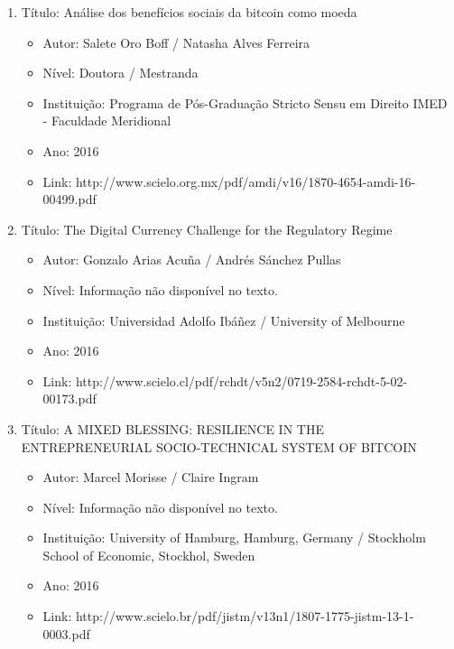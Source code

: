\documentclass[12pt]{article}
\begin{document}
\begin{enumerate}[I]

\item Título: Análise dos benefícios sociais da bitcoin como moeda

\begin{itemize}

\item Autor: Salete Oro Boff / Natasha Alves Ferreira

\item Nível: Doutora / Mestranda

\item Instituição: Programa de Pós-Graduação Stricto Sensu em Direito IMED - Faculdade Meridional

\item Ano: 2016

\item Link: http://www.scielo.org.mx/pdf/amdi/v16/1870-4654-amdi-16-00499.pdf

\end{itemize}


\item Título: The Digital Currency Challenge for the Regulatory Regime
\begin{itemize}

\item Autor: 
Gonzalo Arias Acuña / Andrés Sánchez Pullas
\item Nível: Informação não disponível no texto.
\item Instituição: Universidad Adolfo Ibáñez / University of Melbourne
\item Ano: 
2016
\item Link: 
http://www.scielo.cl/pdf/rchdt/v5n2/0719-2584-rchdt-5-02-00173.pdf
\end{itemize}


\item Título: A MIXED BLESSING: RESILIENCE IN THE ENTREPRENEURIAL SOCIO-TECHNICAL SYSTEM OF BITCOIN
\begin{itemize}

\item Autor: 
Marcel Morisse / Claire Ingram
\item Nível: Informação não disponível no texto.
\item Instituição: University of Hamburg, Hamburg, Germany / Stockholm School of Economic, Stockhol, Sweden
\item Ano: 
2016
\item Link: 
http://www.scielo.br/pdf/jistm/v13n1/1807-1775-jistm-13-1-0003.pdf
\end{itemize}



\end{enumerate}
\end{document}
